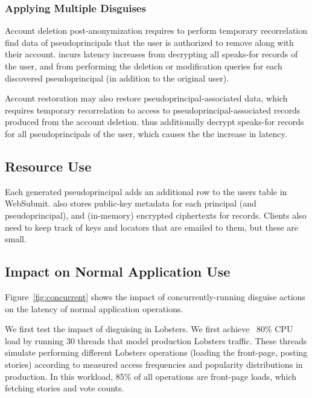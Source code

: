 \subsubsection{Applying Multiple Disguises}


Account deletion post-anonymization requires \sys to perform temporary recorrelation find data of
pseudoprincipals that the user is authorized to remove along with their account. \sys incurs latency
increases from decrypting all speaks-for records of the user, and from performing the deletion or
modification queries for each discovered pseudoprincipal (in addition to the original user).

Account restoration may also restore pseudoprincipal-associated data, which requires temporary
recorrelation to access to pseudoprincipal-associated records produced from the account deletion.
\sys thus additionally decrypt speaks-for records for all pseudoprincipals of the user, which causes
the the increase in latency.

\subsection{Resource Use}
\label{s:eval-res}


%
Each generated pseudoprincipal adds an additional row to the users table in WebSubmit.
%
\sys also stores public-key metadata for each principal (and pseudoprincipal), and
(in-memory) encrypted ciphertexts for records.
%
Clients also need to keep track of keys and locators that are emailed to them, but these
are small.
%

\subsection{Impact on Normal Application Use}
\label{s:eval-conc}

Figure~\ref{fig:concurrent} shows the impact of concurrently-running disguise actions on the latency
of normal application operations.

We first test the impact of disguising in Lobsters. We first achieve ~80\% CPU load by running
30 threads that model production Lobsters traffic. These threads simulate performing different
Lobsters operations (\eg loading the front-page, posting stories) according to measured access
frequencies and popularity distributions in production. In this workload, 85\% of all
operations are front-page loads, which fetching stories and vote counts.

